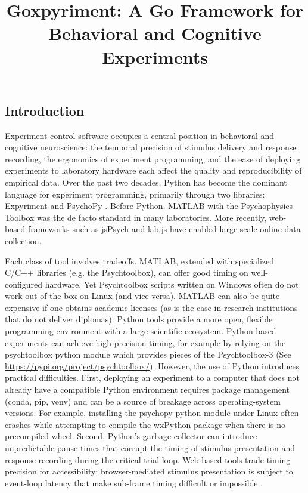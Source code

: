 \documentclass[jou,a4paper]{apa7}
\title{Goxpyriment: A Go Framework for Behavioral and Cognitive Experiments}
\begin{document}
\maketitle

\subsection{Introduction}\label{introduction}

Experiment-control software occupies a central position in behavioral
and cognitive neuroscience: the temporal precision of stimulus
delivery and response recording, the ergonomics of experiment
programming, and the ease of deploying experiments to laboratory
hardware each affect the quality and reproducibility of empirical
data. Over the past two decades, Python has become the dominant
language for experiment programming, primarily through two libraries:
Expyriment \parencite{krause2014} and
PsychoPy \parencite{peirce2019}. Before Python, MATLAB with the
Psychophysics Toolbox \parencite{brainard1997, kleiner2007} was the de
facto standard in many laboratories. More recently, web-based
frameworks such as jsPsych \parencite{deleeuw2015, deleeuw2023} and
lab.js \parencite{henninger2022} have enabled large-scale online data
collection.

Each class of tool involves tradeoffs. MATLAB, extended with
specialized C/C++ libraries (e.g. the Psychtoolbox), can offer good
timing on well-configured hardware. Yet Psychtoolbox scripts written
on Windows often do not work out of the box on Linux (and
vice-versa). MATLAB can also be quite expensive if one obtains
academic licenses (as is the case in research institutions that do not
deliver diplomas).  Python tools provide a more open, flexible
programming environment with a large scientific
ecosystem. Python-based experiments can achieve high-precision timing,
for example by relying on the psychtoolbox python module which
provides pieces of the Psychtoolbox-3 (See
\url{https://pypi.org/project/psychtoolbox/}). However, the use of
Python introduces practical difficulties.  First, deploying an
experiment to a computer that does not already have a compatible
Python environment requires package management (conda, pip, venv) and
can be a source of breakage across operating-system versions. For
example, installing the psychopy python module under Linux often
crashes while attempting to compile the wxPython package when there is
no precompiled wheel.  Second, Python's garbage collector can
introduce unpredictable pause times that corrupt the timing of
stimulus presentation and response recording during the critical trial
loop. Web-based tools trade timing precision for accessibility:
browser-mediated stimulus presentation is subject to event-loop
latency that make sub-frame timing difficult or impossible
\parencite{bridges2020, anwylirvine2021}.
\end{document}
